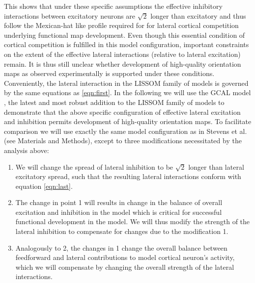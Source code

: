 \documentclass[a4paper,10pt]{article}
\begin{document}
This shows that under these specific assumptions the effective inhibitory interactions between excitatory neurons are $\sqrt{2}$ longer than excitatory and thus follow the Mexican-hat like profile required for for lateral cortical competition underlying functional map development. Even though this essential condition of cortical competition is fulfilled in this model configuration, important constraints on the extent of the effective lateral
interactions (relative to lateral excitation) remain. It is thus still unclear whether development of high-quality orientation maps as observed experimentally is supported under these conditions. Conveniently, the lateral interaction in the LISSOM family of models is governed by the same equations as \ref{eqn:first}. In the following we will use the GCAL model \cite{Stevens2013}, the latest and most robust addition to the LISSOM family of models 
to demonstrate that the above specific configuration of effective lateral excitation and inhibition permits development of high-quality orientation maps. To facilitate comparison we will use exactly the same model configuration 
as in Stevens et al. \cite{Stevens2013} (see Materials and Methods), except to three modifications necessitated by the analysis above:

\begin{enumerate}

\item We will change the spread of lateral inhibition to be $\sqrt{2}$ longer than lateral excitatory spread, such that the resulting lateral
interactions conform with equation \ref{eqn:last}.

\item The change in point 1 will results in change in the balance of overall excitation and inhibition in the model which is critical 
for successful functional development in the model. We will thus modify the strength of the lateral inhibition to compensate for changes due to the modification 1.

\item Analogously to 2, the changes in 1 change the overall balance between feedforward and lateral contributions to model cortical neuron's activity, 
which we will compensate by changing the overall strength of the lateral interactions.

\end{enumerate} 
\end{document}

